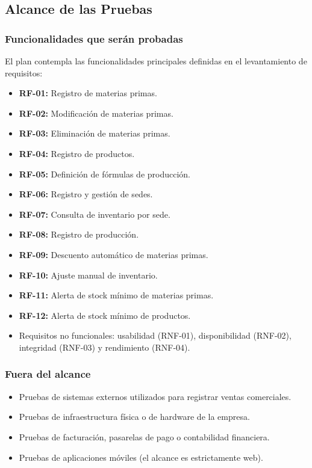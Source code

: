 \documentclass[11pt,a4paper]{article}
\begin{document}
\subsection{Alcance de las Pruebas}
\subsubsection{Funcionalidades que serán probadas}
El plan contempla las funcionalidades principales definidas en el levantamiento de requisitos:
\begin{itemize}
    \item \textbf{RF-01:} Registro de materias primas.
    \item \textbf{RF-02:} Modificación de materias primas.
    \item \textbf{RF-03:} Eliminación de materias primas.
    \item \textbf{RF-04:} Registro de productos.
    \item \textbf{RF-05:} Definición de fórmulas de producción.
    \item \textbf{RF-06:} Registro y gestión de sedes.
    \item \textbf{RF-07:} Consulta de inventario por sede.
    \item \textbf{RF-08:} Registro de producción.
    \item \textbf{RF-09:} Descuento automático de materias primas.
    \item \textbf{RF-10:} Ajuste manual de inventario.
    \item \textbf{RF-11:} Alerta de stock mínimo de materias primas.
    \item \textbf{RF-12:} Alerta de stock mínimo de productos.
    \item Requisitos no funcionales: usabilidad (RNF-01), disponibilidad (RNF-02), integridad (RNF-03) y rendimiento (RNF-04).
\end{itemize}

\subsubsection{Fuera del alcance}
\begin{itemize}
    \item Pruebas de sistemas externos utilizados para registrar ventas comerciales.
    \item Pruebas de infraestructura física o de hardware de la empresa.
    \item Pruebas de facturación, pasarelas de pago o contabilidad financiera.
    \item Pruebas de aplicaciones móviles (el alcance es estrictamente web).
\end{itemize}
\end{document}
